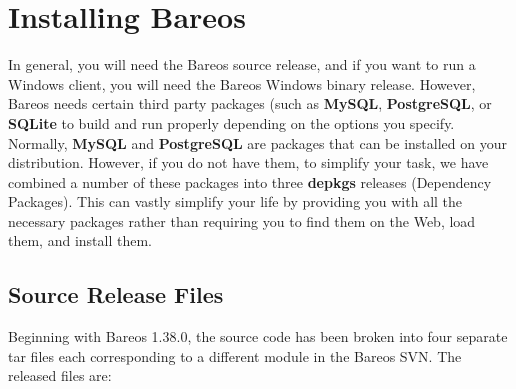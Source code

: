 
\chapter{Installing Bareos}

In general, you will need the Bareos source release, and if you want to run
a Windows client, you will need the Bareos Windows binary release.
However, Bareos needs certain third party packages (such as {\bf MySQL},
{\bf PostgreSQL}, or {\bf SQLite} to build and run
properly depending on the
options you specify.  Normally, {\bf MySQL} and {\bf PostgreSQL} are
packages that can be installed on your distribution.  However, if you do
not have them, to simplify your task, we have combined a number of these
packages into three {\bf depkgs} releases (Dependency Packages).  This can
vastly simplify your life by providing you with all the necessary packages
rather than requiring you to find them on the Web, load them, and install
them.

\section{Source Release Files}
Beginning with Bareos 1.38.0, the source code has been broken into
four separate tar files each corresponding to a different module in
the Bareos SVN. The released files are:

